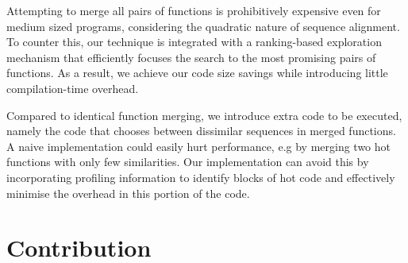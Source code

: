 Attempting to merge all pairs of functions is prohibitively expensive even for medium sized programs, considering the quadratic nature of sequence alignment.
To counter this, our technique is integrated with a ranking-based exploration mechanism that efficiently focuses the search to the most
promising pairs of functions. %
As a result, we achieve our code size savings while introducing little compilation-time
overhead.

Compared to identical function merging, we introduce extra code to be executed,
namely the code that chooses between dissimilar sequences in merged functions.
A naive implementation could easily hurt performance, e.g by merging two hot functions
with only few similarities. Our implementation can avoid this by incorporating
profiling information to identify blocks of hot code and effectively minimise 
the overhead in this portion of the code.

\section{Contribution}

